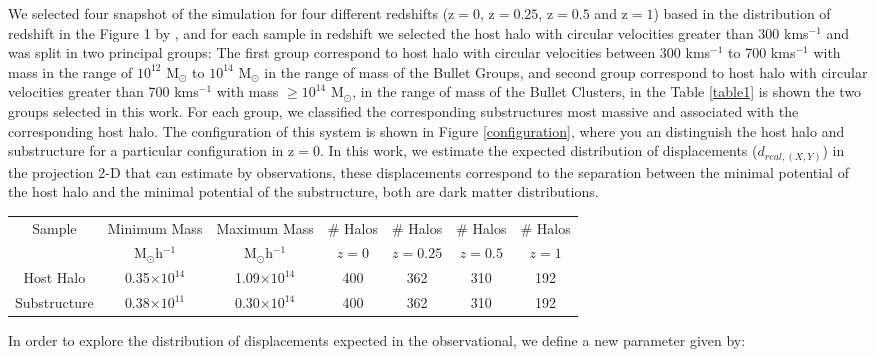 \documentclass{emulateapj}
\begin{document}
We selected four snapshot of the simulation for four different
redshifts (z$=0$, z$=0.25$, z$=0.5$ and z$=1$) based in the
distribution of redshift in the Figure 1 by \citet{verdugo}, and  for
each sample in redshift we selected the host halo with circular
velocities greater than 300 kms$^{-1}$ and was split in two  principal
groups: The first group correspond to host halo with circular
velocities between 300 kms$^{-1}$ to 700 kms${^{-1}}$ with mass in the
range of $10^{12}$ M$_\odot{}$ to $10^{14}$ M$_\odot{}$ in the range
of mass of the Bullet Groups, and second group correspond to host halo
with circular velocities greater than 700 kms$^{-1}$ with mass
$\geq10^{14}$ M$_\odot{}$, in the range of mass of the Bullet
Clusters, in  the Table \ref{table1} is shown the two groups selected
in this work. For each group, we  classified the corresponding
substructures most massive and associated with the corresponding host
halo. The configuration of this system is shown in  Figure
\ref{configuration}, where you  an distinguish the host halo and
substructure for a particular configuration in z$=0$. In  this work,
we estimate the expected distribution of displacements
($d_{real,(X,Y)}$) in the projection 2-D that can estimate by
observations, these displacements correspond to the separation between
the minimal potential of the host halo and the  minimal potential of
the substructure, both are dark matter distributions. 


\begin{table*}
\begin{center}
\begin{tabular}{ccccccc}\hline\hline
Sample       & Minimum Mass           & Maximum Mass          & \# Halos  & \# Halos  & \# Halos & \# Halos \\
             & M$_{\odot}$h$^{-1}$    & M$_{\odot}$h$^{-1}$   &   $z=0$   & $z=0.25$  & $z=0.5$  & $z=1$  \\\hline
Host Halo    & 0.35$\times{}10^{14}$  & 1.09$\times{}10^{14}$ &    400    &   362     &   310    &  192   \\
Substructure & 0.38$\times{}10^{11}$  & 0.30$\times{}10^{14}$ &    400    &   362     &   310    &  192   \\\hline
\end{tabular} 
\caption{Mass ranges for the two groups selected in this work in different redshifts.}
\label{table1}
\end{center}
\end{table*}


In order to explore the distribution of displacements expected in the observational, we define a new parameter given by:\\
\end{document}
